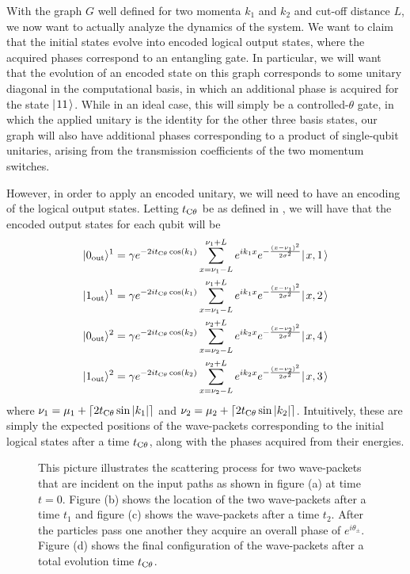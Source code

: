 \documentclass[../thesis-main/thesis-main]{subfiles}
\begin{document}
With the graph $G$ well defined for two momenta $k_1$ and $k_2$ and cut-off distance $L$, we now want to actually analyze the dynamics of the system.  We want to claim that the initial states evolve into encoded logical output states, where the acquired phases correspond to an entangling gate.  In particular, we will want that the evolution of an encoded state on this graph corresponds to some unitary diagonal in the computational basis, in which an additional phase is acquired for the state $|\mspace{2mu} 11 \mspace{2mu} \rangle$.  While in an ideal case, this will simply be a controlled-$\theta$ gate, in which the applied unitary is the identity for the other three basis states, our graph will also have additional phases corresponding to a product of single-qubit unitaries, arising from the transmission coefficients of the two momentum switches.

However, in order to apply an encoded unitary, we will need to have an encoding of the logical output states.  Letting $t_{\mathrm{C}\theta}$ be as defined in , we will have that the encoded output states for each qubit will be 
\begin{align}
  |0_\text{out}\rangle^1 &=\gamma e^{-2it_{\mathrm{C}\theta}\cos(k_1)}\sum_{x = \nu_1 -L} ^{\nu_1 + L}  e^{i k_{1} x} e^{- \frac{(x-\nu_1)^2}{2\sigma^2}} |\mspace{2mu} x,1 \mspace{2mu} \rangle
  \label{eq:cd_output_10}\\
  |1_\text{out}\rangle^1 &=\gamma e^{-2it_{\mathrm{C}\theta}\cos(k_1)} \sum_{x = \nu_1 -L} ^{\nu_1 + L}  e^{i k_{1} x} e^{- \frac{(x-\nu_1)^2}{2\sigma^2}} |\mspace{2mu} x,2 \mspace{2mu} \rangle \label{eq:cd_output_11}\\
  |0_\text{out}\rangle^2 &=\gamma e^{-2it_{\mathrm{C}\theta}\cos(k_2)} \sum_{x = \nu_2 -L} ^{\nu_2 + L}  e^{i k_{2} x} e^{- \frac{(x-\nu_2)^2}{2\sigma^2}} |\mspace{2mu} x,4 \mspace{2mu} \rangle \label{eq:cd_output_20}\\
  |1_\text{out}\rangle^2 &=\gamma e^{-2it_{\mathrm{C}\theta}\cos(k_2)} \sum_{x = \nu_2 -L} ^{\nu_2 + L}  e^{i k_{2} x} e^{- \frac{(x-\nu_2)^2}{2\sigma^2}} |\mspace{2mu} x,3 \mspace{2mu} \rangle\label{eq:cd_output_21}
\end{align}
where  $\nu_1=\mu_1 + \lceil 2t_{\mathrm{C}\theta} \sin |k_1|\rceil $ and $\nu_{2}=\mu_2 + \lceil 2 t_{\mathrm{C}\theta}\sin |k_2| \rceil$. Intuitively, these are simply the expected positions of the wave-packets corresponding to the initial logical states after a time $t_{\mathrm{C}\theta}$, along with the phases acquired from their energies.  

\begin{figure}
  \centering
   
  \caption{This picture illustrates the scattering process for two wave-packets that are incident on the input paths as shown in figure (a) at time $t=0$. Figure (b) shows the location of the two wave-packets after a time $t_{1}$ and figure (c) shows the wave-packets after a time $t_{2}$. After the particles pass one another they acquire an overall phase of $e^{i\theta_\pm}$. Figure (d) shows the final configuration of the wave-packets after a total evolution time $t_{\mathrm{C}\theta}$.}
  \label{fig:11_scattering_cartoon}
\end{figure}
\end{document}

